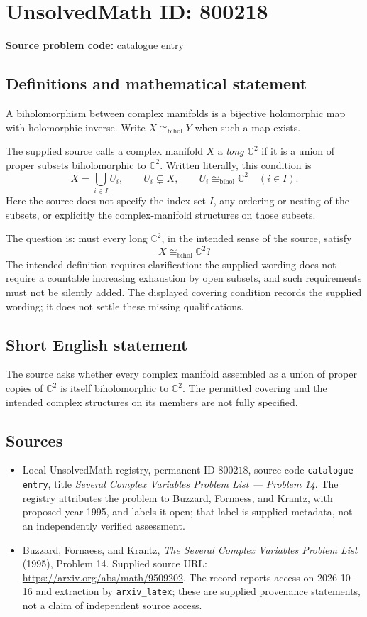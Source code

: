 \documentclass[11pt]{article}
\newcommand{\C}{\mathbb{C}}
\begin{document}
\section*{UnsolvedMath ID: 800218}
\textbf{Source problem code:} catalogue entry
\subsection{Definitions and mathematical statement}
A biholomorphism between complex manifolds is a bijective holomorphic map with holomorphic inverse. Write \(X\cong_{\mathrm{bihol}}Y\) when such a map exists.

The supplied source calls a complex manifold \(X\) a \emph{long \(\C^2\)} if it is a union of proper subsets biholomorphic to \(\C^2\). Written literally, this condition is
\[
X=\bigcup_{i\in I}U_i,\qquad U_i\subsetneq X,\qquad U_i\cong_{\mathrm{bihol}}\C^2\quad(i\in I).
\]
Here the source does not specify the index set \(I\), any ordering or nesting of the subsets, or explicitly the complex-manifold structures on those subsets.

The question is: must every long \(\C^2\), in the intended sense of the source, satisfy
\[
X\cong_{\mathrm{bihol}}\C^2?
\]
The intended definition requires clarification: the supplied wording does not require a countable increasing exhaustion by open subsets, and such requirements must not be silently added. The displayed covering condition records the supplied wording; it does not settle these missing qualifications.
\subsection{Short English statement}
The source asks whether every complex manifold assembled as a union of proper copies of \(\C^2\) is itself biholomorphic to \(\C^2\). The permitted covering and the intended complex structures on its members are not fully specified.
\subsection{Sources}
\begin{itemize}
\item Local UnsolvedMath registry, permanent ID \(800218\), source code \texttt{catalogue entry}, title \emph{Several Complex Variables Problem List --- Problem 14}. The registry attributes the problem to Buzzard, Fornaess, and Krantz, with proposed year 1995, and labels it open; that label is supplied metadata, not an independently verified assessment.
\item Buzzard, Fornaess, and Krantz, \emph{The Several Complex Variables Problem List} (1995), Problem 14. Supplied source URL: \url{https://arxiv.org/abs/math/9509202}. The record reports access on 2026-10-16 and extraction by \texttt{arxiv\_latex}; these are supplied provenance statements, not a claim of independent source access.
\end{itemize}
\end{document}
